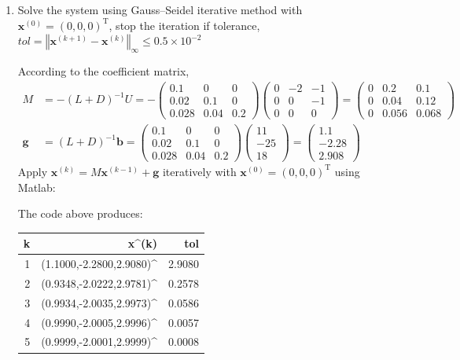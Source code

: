 \documentclass[10pt]{report}
\newcommand{\norm}[2][\infty] {\left\Vert \mathbf{#2} \right\Vert_#1}
\begin{document}
\begin{enumerate}
\begin{enumerate}
		\item 
		Solve the system using Gauss--Seidel iterative method with $\mathbf{x}^{(0)} = (0, 0, 0)^\mathrm{T}$, stop the iteration if tolerance, $tol = \norm{x^{(\mathit k + \mathrm 1)} - x^{(\mathit{k})}} \le 0.5\times 10^{-2}$
		
		According to the coefficient matrix,
		\begin{align*}
		M &= -(L+D)^{-1}U = -\begin{pmatrix}
		0.1 & 0 & 0\\
		0.02 & 0.1 & 0\\
		0.028 & 0.04 & 0.2
		\end{pmatrix}
		\begin{pmatrix}
		0 & -2 & -1\\
		0 & 0 & -1\\
		0 & 0 & 0
		\end{pmatrix}
		=
		\begin{pmatrix}
		0 & 0.2 & 0.1\\
		0 & 0.04 & 0.12\\
		0 & 0.056 & 0.068
		\end{pmatrix}
		\\
		\mathbf{g} &= (L+D)^{-1}\mathbf{b} = \begin{pmatrix}
		0.1 & 0 & 0\\
		0.02 & 0.1 & 0\\
		0.028 & 0.04 & 0.2
		\end{pmatrix}
		\begin{pmatrix}
		11\\
		-25\\
		18
		\end{pmatrix}
		=
		\begin{pmatrix}
		1.1\\
		-2.28\\
		2.908
		\end{pmatrix}
		\end{align*}
		Apply $\mathbf{x}^{(k)} = M\mathbf{x}^{(k-1)} + \mathbf{g}$ iteratively with $\mathbf{x}^{(0)} = (0, 0, 0)^\mathrm{T}$ using Matlab:
		
		The code above produces:
		\begin{table}[H]
			\centering
			\begin{tabular}{NNN} \toprule
				k & x^{(k)} & tol \\  & (1.1000,-2.2800,2.9080)^ & 2.9080\\
				2 & (0.9348,-2.0222,2.9781)^ & 0.2578\\
				3 & (0.9934,-2.0035,2.9973)^ & 0.0586\\
				4 & (0.9990,-2.0005,2.9996)^ & 0.0057\\
				5 & (0.9999,-2.0001,2.9999)^ & 0.0008\\
				\bottomrule
			\end{tabular}
		\end{table}
		

\end{enumerate}
\end{enumerate}
\end{document}
